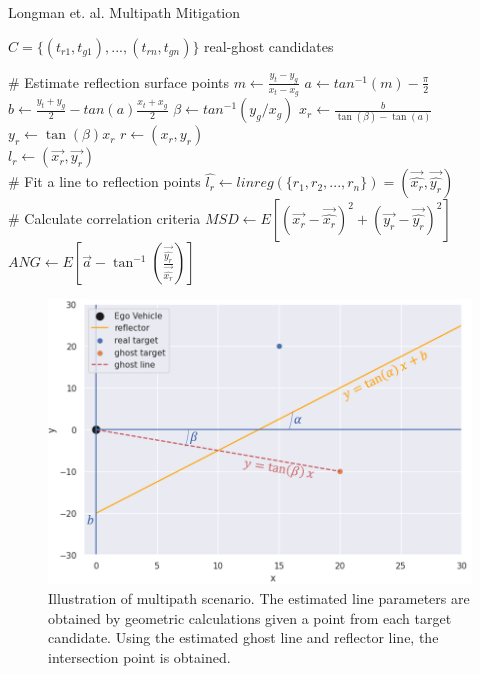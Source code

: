 \documentclass[../main.tex]{subfiles}
\begin{document}
\begin{algorithm}
\caption{Longman et. al. Multipath Mitigation}\label{alg:orig}
\begin{algorithmic}

\State $C = \{(t_{r1},t_{g1}), ..., (t_{rn},t_{gn})\}$  real-ghost candidates\;

\State \# Estimate reflection surface points
        \State $m \gets \frac{y_t-y_g}{x_t-x_g}$
        \State $a \gets tan^{-1}(m)-\frac{\pi}{2}$
        \State $b \gets \frac{y_t+y_g}{2}-tan(a)\frac{x_t+x_g}{2}$
        \State $\beta \gets tan^{-1}(y_g/x_g)$
        \State $x_r \gets \frac{b}{\tan(\beta) - \tan(a)}$
        \State $y_r \gets \tan(\beta)x_r$
        \State $r \gets (x_r, y_r)$
    \EndFor\;\\
    $l_r \gets (\Vec{x_r}, \Vec{y_r})$ \;
\EndFor\;\\

\State \# Fit a line to reflection points
\State $\hat{l_r} \gets linreg(\{r_1, r_2, ... , r_n\}) = (\Vec{\hat{x_r}}, \Vec{\hat{y_r}})$\;\\

\State \# Calculate correlation criteria
\State $MSD \gets E[(\Vec{x_r}-\Vec{\hat{x_r}})^2 + (\Vec{y_r}-\Vec{\hat{y_r}})^2]$\;
\State $ANG \gets E[\vec{a}-\tan^{-1}{(\frac{\Vec{\hat{y_r}}}{\Vec{\hat{x_r}}})}]$\;
\end{algorithmic}
\end{algorithm}

\begin{figure}[htbp]
    \centerline{\includegraphics[scale=0.33]{figures/fig_method.png}}
    \caption{Illustration of multipath scenario. The estimated line parameters are obtained by geometric calculations given a point from each target candidate. Using the estimated ghost line and reflector line, the intersection point is obtained.}
    \label{fig:method}
\end{figure}
\end{document}
